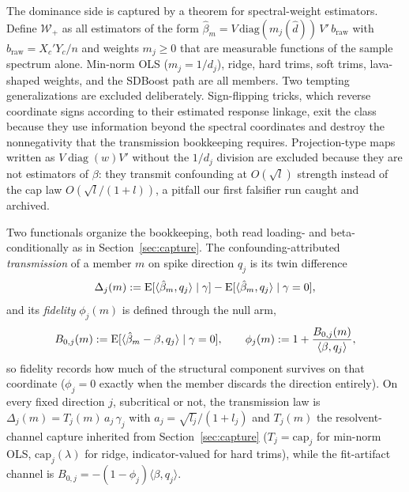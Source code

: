 The dominance side is captured by a theorem for spectral-weight estimators. Define $\mathcal{W}_+$ as all estimators of the form $\hat\beta_m = V\,\mathrm{diag}(m_j(\hat d))\,V'\,b_{\mathrm{raw}}$ with $b_{\mathrm{raw}} = X_c'Y_c/n$ and weights $m_j \ge 0$ that are measurable functions of the sample spectrum alone. Min-norm OLS ($m_j = 1/d_j$), ridge, hard trims, soft trims, lava-shaped weights, and the SDBoost path are all members. Two tempting generalizations are excluded deliberately. Sign-flipping tricks, which reverse coordinate signs according to their estimated response linkage, exit the class because they use information beyond the spectral coordinates and destroy the nonnegativity that the transmission bookkeeping requires. Projection-type maps written as $V\operatorname{diag}(w)V'$ without the $1/d_j$ division are excluded because they are not estimators of $\beta$: they transmit confounding at $O(\sqrt{l})$ strength instead of the cap law $O(\sqrt{l}/(1+l))$, a pitfall our first falsifier run caught and archived.

Two functionals organize the bookkeeping, both read loading- and beta-conditionally as in Section~\ref{sec:capture}. The confounding-attributed \emph{transmission} of a member $m$ on spike direction $q_j$ is its twin difference
\[
\Delta_j(m):=\mathrm{E}[\langle\hat\beta_m,q_j\rangle\mid\gamma]-\mathrm{E}[\langle\hat\beta_m,q_j\rangle\mid\gamma=0],
\]
and its \emph{fidelity} $\phi_j(m)$ is defined through the null arm,
\[
B_{0,j}(m):=\mathrm{E}[\langle\hat\beta_m-\beta,q_j\rangle\mid\gamma=0],
\qquad
\phi_j(m):=1+\frac{B_{0,j}(m)}{\langle\beta,q_j\rangle},
\]
so fidelity records how much of the structural component survives on that coordinate ($\phi_j=0$ exactly when the member discards the direction entirely). On every fixed direction $j$, subcritical or not, the transmission law is $\Delta_j(m)=T_j(m)\,a_j\,\gamma_j$ with $a_j=\sqrt{l_j}/(1+l_j)$ and $T_j(m)$ the resolvent-channel capture inherited from Section~\ref{sec:capture} ($T_j=\mathrm{cap}_j$ for min-norm OLS, $\mathrm{cap}_j(\lambda)$ for ridge, indicator-valued for hard trims), while the fit-artifact channel is $B_{0,j}=-(1-\phi_j)\langle\beta,q_j\rangle$.

